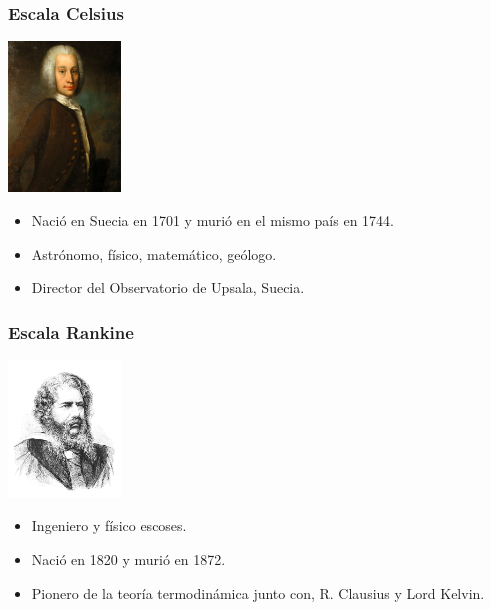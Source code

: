 \documentclass[handout]{beamer}
\begin{document}
\begin{frame}
  \frametitle{Escala Celsius}
  \begin{center}
    \includegraphics[width=3cm]{celsius}
  \end{center}

  \begin{itemize}
  \item Nació en Suecia en 1701 y murió en el mismo país en 1744.
  \item Astrónomo, físico, matemático, geólogo.
  \item Director del Observatorio de Upsala, Suecia.
  \end{itemize}
\end{frame}

\begin{frame}
  \frametitle{Escala Rankine}
  \begin{center}
    \includegraphics[width=3cm]{rankine}
  \end{center}

  \begin{itemize}
  \item Ingeniero y físico escoses.
  \item Nació en 1820 y murió en 1872.
  \item Pionero de la teoría termodinámica junto con, R. Clausius y Lord
    Kelvin.
  \end{itemize}
\end{frame}
\end{document}
